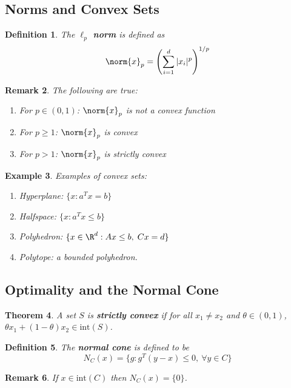 \documentclass[a4paper]{article}
\newtheorem{thm}{Theorem}[section]
\newtheorem{defn}[thm]{Definition}
\newtheorem{eg}[thm]{Example}
\newtheorem{rmk}[thm]{Remark}
\begin{document}
\subsection{Norms and Convex Sets}
\begin{defn}
    The \textbf{$\ell_p$ norm} is defined as 
    \[
        \norm{x}_p = \left( \sum_{i=1}^d |x_i|^p \right)^{1/p}
    \]
\end{defn}

\begin{rmk}
    The following are true:
    \begin{enumerate}
        \item For $p \in (0,1)$: $\norm{x}_p$ is not a convex function
        \item For $p \geq 1$: $\norm{x}_p$ is convex
        \item For $p > 1$: $\norm{x}_p$ is strictly convex
    \end{enumerate}
\end{rmk}

\begin{eg}
    Examples of convex sets:
    \begin{enumerate}
        \item Hyperplane: $\{ x : a^T x = b \}$
        \item Halfspace: $\{ x : a^T x \leq b \}$
        \item Polyhedron: $\{ x \in \R^d : Ax \leq b,\; Cx = d \}$
        \item Polytope: a bounded polyhedron.
    \end{enumerate}
\end{eg}

\subsection{Optimality and the Normal Cone}
\begin{thm}
    A set $S$ is \textbf{strictly convex} if for all $x_1 \neq x_2$ and $\theta \in (0, 1)$, $\theta x_1 + (1-\theta) x_2 \in \mathrm{int}(S)$.
\end{thm}

\begin{defn}
    The \textbf{normal cone} is defined to be
    \[
        N_C(x) = \{ g : g^T(y - x) \leq 0,\ \forall y \in C \}
    \]
\end{defn}

\begin{rmk}
    If $x \in \mathrm{int}(C)$ then $N_C(x) = \{0\}$.
\end{rmk}
\end{document}
